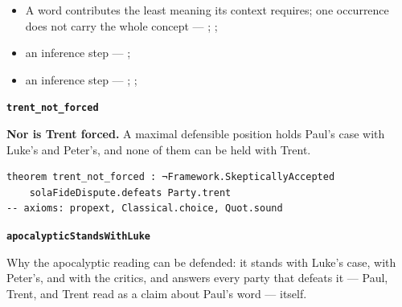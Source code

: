 \documentclass[11pt]{article}
\begin{document}
\begin{itemize}
\begin{itemize}
\item A word contributes the least meaning its context requires; one occurrence does not carry the whole concept --- \cite{silva-biblical-words-1994}; \cite{joos-semantic-axiom-1972}; \cite{barr-semantics-2004}
\item an inference step --- \cite[ad loc. Rom 4:6]{moo-romans-1996}; \cite[s.v. λογίζομαι]{bauer-danker-lexicon-2000}
\item an inference step --- \cite{silva-biblical-words-1994}; \cite[p. 80]{moo-romans-1996}; \cite{barr-semantics-2004}
\end{itemize}
\end{itemize}
\par\medskip\noindent\textbf{\texttt{trent\_\allowbreak{}not\_\allowbreak{}forced}}\par\nobreak\noindent
\textbf{Nor is Trent forced.} A maximal defensible position holds Paul's case with Luke's and Peter's, and none of them can be held with Trent.

{\small\begin{verbatim}
theorem trent_not_forced : ¬Framework.SkepticallyAccepted
    solaFideDispute.defeats Party.trent
-- axioms: propext, Classical.choice, Quot.sound
\end{verbatim}}
\par\medskip\noindent\textbf{\texttt{apocalyptic\allowbreak{}Stands\allowbreak{}With\allowbreak{}Luke}}\par\nobreak\noindent
Why the apocalyptic reading can be defended: it stands with Luke's case, with Peter's, and with the critics, and answers every party that defeats it — Paul, Trent, and Trent read as a claim about Paul's word — itself.
\end{document}
